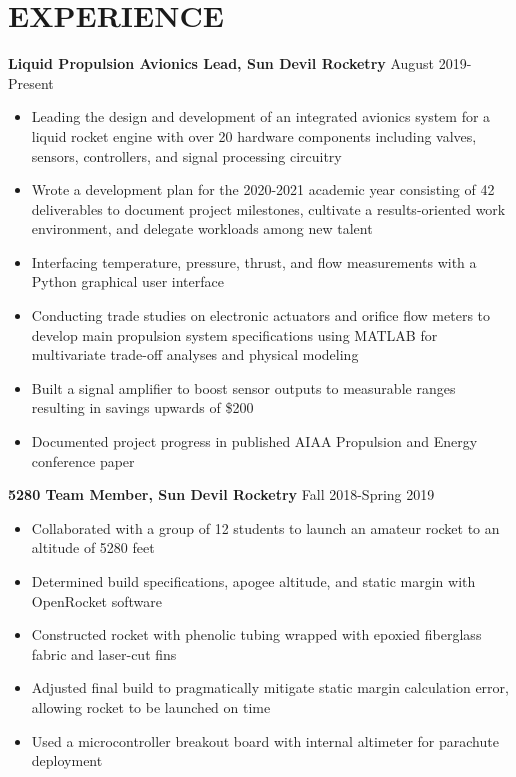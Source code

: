 \documentclass{article}
\begin{document}
\section{EXPERIENCE}
\textbf{Liquid Propulsion Avionics Lead, Sun Devil Rocketry}
\hfill
\vspace{0.5em}
August 2019-Present
\begin{itemize}
	\item{Leading the design and development of an integrated avionics system for a liquid rocket engine with over 20 hardware components including valves, sensors, controllers, and signal processing circuitry}
	\item{Wrote a development plan for the 2020-2021 academic year consisting of 42 deliverables to document project milestones, cultivate a results-oriented work environment, and delegate workloads among new talent}
	\item{Interfacing temperature, pressure, thrust, and flow measurements with a Python graphical user interface}
	\item{Conducting trade studies on electronic actuators and orifice flow meters to develop main propulsion system specifications using MATLAB for multivariate trade-off analyses and physical modeling}
	\item{Built a signal amplifier to boost sensor outputs to measurable ranges resulting in savings upwards of \$200}
	\item{Documented project progress in published AIAA Propulsion and Energy conference paper}
	
\end{itemize}
\vspace{1em}
\textbf{5280 Team Member, Sun Devil Rocketry}
\hfill Fall 2018-Spring 2019
\vspace{0.5em}
\begin{itemize}
	\item Collaborated with a group of 12 students to launch an amateur rocket to an altitude of 5280 feet
	\item Determined build specifications, apogee altitude, and static margin with OpenRocket software
	\item Constructed rocket with phenolic tubing wrapped with epoxied fiberglass fabric and laser-cut fins 
	\item Adjusted final build to pragmatically mitigate static margin calculation error, allowing rocket to be launched on time
	\item Used a microcontroller breakout board with internal altimeter for parachute deployment
\end{itemize}
\end{document}
